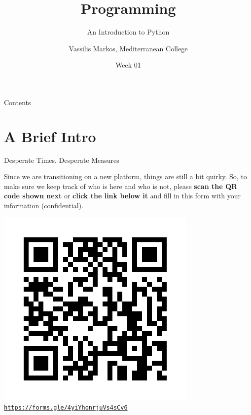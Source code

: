 \documentclass[aspectratio=169, 12pt, xcolor=table]{beamer}
\title{Programming}
\subtitle{An Introduction to Python}
\date{Week 01}
\author{Vassilis Markos, Mediterranean College}
\newcommand{\ohref}[1]{\href{#1}{\texttt{#1}}}
\begin{document}
	\begin{frame}
		\titlepage
	\end{frame}

	\begin{frame}{Contents}
		\tableofcontents
	\end{frame}

	\section{A Brief Intro}\label{sec:a-brief-intro}
	
	\sectionframe
	
	\begin{headsup}{Desperate Times, Desperate Measures}
		\begin{minipage}[t]{0.40\textwidth}
			\vspace{0pt}
			Since we are transitioning on a new platform, things are still a bit quirky. So, to make sure we keep track of who is here and who is not, please \textbf{scan the QR code shown next} or \textbf{click the link below it} and fill in this form with your information (confidential).
		\end{minipage}\hfill
		\begin{minipage}[t]{0.58\textwidth}
			\vspace{0pt}
			\raggedleft
			\includegraphics[scale=0.35]{./assets/attendance_form.png}
			\centering
			\ohref{https://forms.gle/4yiYhonrjuVs4sCv6}
		\end{minipage}
	\end{headsup}
\end{document}
